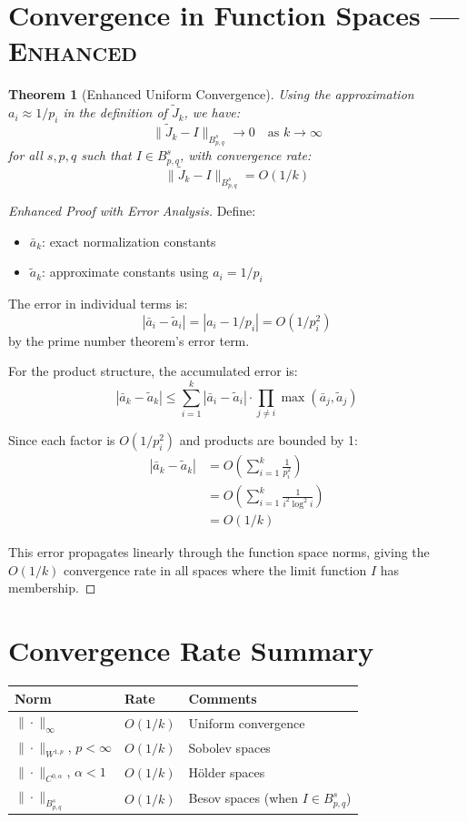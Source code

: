 ﻿\documentclass[12pt,a4paper]{report}
\theoremstyle{plain}
\newtheorem{theorem}{Theorem}[section]
\theoremstyle{definition}
\begin{document}
\section{Convergence in Function Spaces --- \textsc{Enhanced}}

\begin{theorem}[Enhanced Uniform Convergence]
\label{thm:convergence}
Using the approximation $a_i \approx 1/p_i$ in the definition of $\tilde{J}_k$, we have:
\[
\|\tilde{J}_k - I\|_{B^s_{p,q}} \to 0 \quad \text{as } k \to \infty
\]
for all $s, p, q$ such that $I \in B^s_{p,q}$, with convergence rate:
\[
\|\tilde{J}_k - I\|_{B^s_{p,q}} = O(1/k)
\]
\end{theorem}

\begin{proof}[Enhanced Proof with Error Analysis]
Define:
\begin{itemize}
    \item $\bar{a}_k$: exact normalization constants
    \item $\tilde{a}_k$: approximate constants using $a_i = 1/p_i$
\end{itemize}

The error in individual terms is:
\[
|\bar{a}_i - \tilde{a}_i| = |a_i - 1/p_i| = O(1/p_i^2)
\]
by the prime number theorem's error term.

For the product structure, the accumulated error is:
\[
|\bar{a}_k - \tilde{a}_k| \leq \sum_{i=1}^k |\bar{a}_i - \tilde{a}_i| \cdot \prod_{j \neq i} \max(\bar{a}_j, \tilde{a}_j)
\]

Since each factor is $O(1/p_i^2)$ and products are bounded by 1:
\begin{align*}
|\bar{a}_k - \tilde{a}_k| &= O\left(\sum_{i=1}^k \frac{1}{p_i^2}\right) \\
&= O\left(\sum_{i=1}^k \frac{1}{i^2\log^2 i}\right) \\
&= O(1/k)
\end{align*}

This error propagates linearly through the function space norms, giving the $O(1/k)$ convergence rate in all spaces where the limit function $I$ has membership.
\end{proof}

\section{Convergence Rate Summary}

\begin{center}
\begin{tabular}{lll}
\toprule
\textbf{Norm} & \textbf{Rate} & \textbf{Comments} \\
\midrule
$\|\cdot\|_\infty$ & $O(1/k)$ & Uniform convergence \\
$\|\cdot\|_{W^{1,p}}$, $p < \infty$ & $O(1/k)$ & Sobolev spaces \\
$\|\cdot\|_{C^{0,\alpha}}$, $\alpha < 1$ & $O(1/k)$ & H\"older spaces \\
$\|\cdot\|_{B^s_{p,q}}$ & $O(1/k)$ & Besov spaces (when $I \in B^s_{p,q}$) \\
\bottomrule
\end{tabular}
\end{center}
\end{document}
